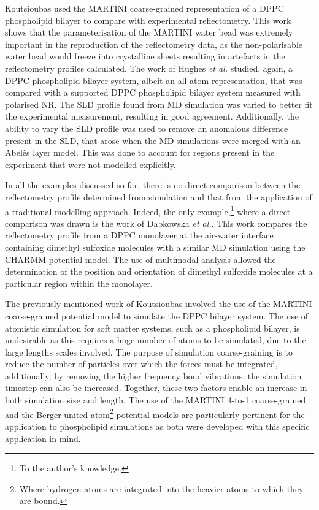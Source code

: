 Koutsioubas used the MARTINI coarse-grained representation of a DPPC phospholipid bilayer to compare with experimental reflectometry.
This work shows that the parameterisation of the MARTINI water bead was extremely important in the reproduction of the reflectometry data, as the non-polarisable water bead would freeze into crystalline sheets resulting in artefacts in the reflectometry profiles calculated.
The work of Hughes \emph{et al.} studied, again, a DPPC phospholipid bilayer system, albeit an all-atom representation, that was compared with a supported DPPC phospholipid bilayer system measured with polarised NR.
The SLD profile found from MD simulation was varied to better fit the experimental measurement, resulting in good agreement.
Additionally, the ability to vary the SLD profile was used to remove an anomalous difference present in the SLD, that arose when the MD simulations were merged with an Abel\`{e}s layer model.
This was done to account for regions present in the experiment that were not modelled explicitly.

In all the examples discussed so far, there is no direct comparison between the reflectometry profile determined from simulation and that from the application of a traditional modelling approach.
Indeed, the only example,\footnote{To the author's knowledge.} where a direct comparison was drawn is the work of Dabkowska \emph{et al.}.
This work compares the reflectometry profile from a DPPC monolayer at the air-water interface containing dimethyl sulfoxide molecules with a similar MD simulation using the CHARMM potential model.
The use of multimodal analysis allowed the determination of the position and orientation of dimethyl sulfoxide molecules at a particular region within the monolayer.

The previously mentioned work of Koutsioubas involved the use of the MARTINI coarse-grained potential model to simulate the DPPC bilayer system.
The use of atomistic simulation for soft matter systems, such as a phospholipid bilayer, is undesirable as this requires a huge number of atoms to be simulated, due to the large lengths scales involved.
The purpose of simulation coarse-graining is to reduce the number of particles over which the forces must be integrated, additionally, by removing the higher frequency bond vibrations, the simulation timestep can also be increased.
Together, these two factors enable an increase in both simulation size and length.
The use of the MARTINI 4-to-1 coarse-grained and the Berger united atom\footnote{Where hydrogen atoms are integrated into the heavier atoms to which they are bound.} potential models are particularly pertinent for the application to phospholipid simulations as both were developed with this specific application in mind.

